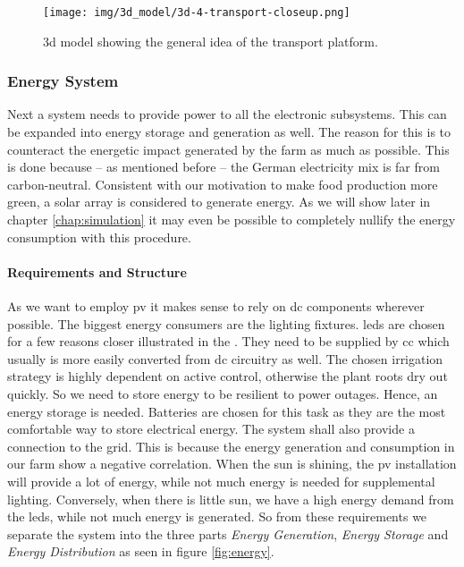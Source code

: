 \begin{figure}[htbp]
  \centering
  \texttt{[image: img/3d\_model/3d-4-transport-closeup.png]}
  \caption{3d model showing the general idea of the transport platform.}
  \label{fig:3d-transport}
\end{figure}

\subsubsection{Energy System}
Next a system needs to provide power to all the electronic subsystems.
This can be expanded into energy storage and generation as well.
The reason for this is to counteract the energetic impact generated by the farm as much as possible.
This is done because -- as mentioned before -- the German electricity mix is far from carbon-neutral.
Consistent with our motivation to make food production more green, a solar array is considered to generate energy.
As we will show later in chapter \ref{chap:simulation} it may even be possible to completely nullify the energy consumption with this procedure.
\paragraph{Requirements and Structure}
As we want to employ \ac{pv} it makes sense to rely on \ac{dc} components wherever possible.
The biggest energy consumers are the lighting fixtures.
\acp{led} are chosen for a few reasons closer illustrated in the .
They need to be supplied by \ac{cc} which usually is more easily converted from \ac{dc} circuitry as well.
The chosen irrigation strategy is highly dependent on active control, otherwise the plant roots dry out quickly.
So we need to store energy to be resilient to power outages.
Hence, an energy storage is needed.
Batteries are chosen for this task as they are the most comfortable way to store electrical energy.
The system shall also provide a connection to the grid.
This is because the energy generation and consumption in our farm show a negative correlation.
When the sun is shining, the \ac{pv} installation will provide a lot of energy, while not much energy is needed for supplemental lighting.
Conversely, when there is little sun, we have a high energy demand from the \acp{led}, while not much energy is generated.
So from these requirements we separate the system into the three parts \textit{Energy Generation}, \textit{Energy Storage} and \textit{Energy Distribution} as seen in figure \ref{fig:energy}.

